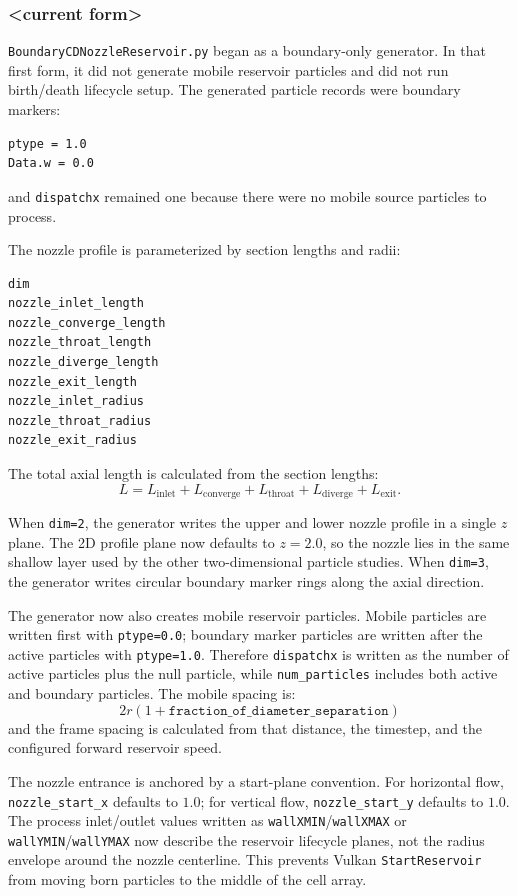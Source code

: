 \subsubsection{<current form>}

\texttt{BoundaryCDNozzleReservoir.py} began as a boundary-only generator.  In
that first form, it did not generate mobile reservoir particles and did not
run birth/death lifecycle setup.  The generated particle records were boundary
markers:
\begin{verbatim}
ptype = 1.0
Data.w = 0.0
\end{verbatim}
and \texttt{dispatchx} remained one because there were no mobile source
particles to process.

The nozzle profile is parameterized by section lengths and radii:
\begin{verbatim}
dim
nozzle_inlet_length
nozzle_converge_length
nozzle_throat_length
nozzle_diverge_length
nozzle_exit_length
nozzle_inlet_radius
nozzle_throat_radius
nozzle_exit_radius
\end{verbatim}
The total axial length is calculated from the section lengths:
\[
L =
L_{\mathrm{inlet}}+
L_{\mathrm{converge}}+
L_{\mathrm{throat}}+
L_{\mathrm{diverge}}+
L_{\mathrm{exit}}.
\]

When \texttt{dim=2}, the generator writes the upper and lower nozzle profile
in a single \(z\) plane.  The 2D profile plane now defaults to \(z=2.0\), so
the nozzle lies in the same shallow layer used by the other two-dimensional
particle studies.  When \texttt{dim=3}, the generator writes circular boundary
marker rings along the axial direction.

The generator now also creates mobile reservoir particles.  Mobile particles
are written first with \texttt{ptype=0.0}; boundary marker particles are
written after the active particles with \texttt{ptype=1.0}.  Therefore
\texttt{dispatchx} is written as the number of active particles plus the null
particle, while \texttt{num\_particles} includes both active and boundary
particles.  The mobile spacing is:
\[
2r(1+\texttt{fraction\_of\_diameter\_separation})
\]
and the frame spacing is calculated from that distance, the timestep, and the
configured forward reservoir speed.

The nozzle entrance is anchored by a start-plane convention.  For horizontal
flow, \texttt{nozzle\_start\_x} defaults to \(1.0\); for vertical flow,
\texttt{nozzle\_start\_y} defaults to \(1.0\).  The process inlet/outlet
values written as \texttt{wallXMIN}/\texttt{wallXMAX} or
\texttt{wallYMIN}/\texttt{wallYMAX} now describe the reservoir lifecycle
planes, not the radius envelope around the nozzle centerline.  This prevents
Vulkan \texttt{StartReservoir} from moving born particles to the middle of the
cell array.

